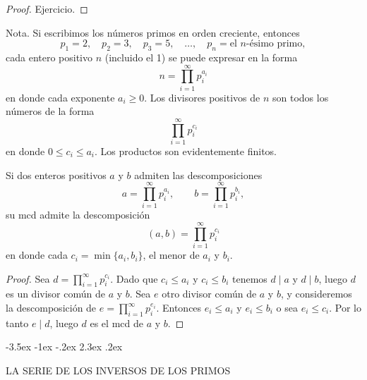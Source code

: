 \documentclass[12pt,a4paper]{book}
\makeatletter
\renewcommand\section{\@startsection{section}{1}{\z@}%
  {-3.5ex \@plus -1ex \@minus -.2ex}%
  {2.3ex \@plus .2ex}%
  {\normalfont\Large\bfseries\raggedright}}
\makeatother
\begin{document}
    \begin{proof}
        Ejercicio.
    \end{proof}

    Nota. Si escribimos los números primos en orden creciente, entonces
    \begin{equation*}
        p_{1}=2,\quad p_{2}=3,\quad p_{3}=5,\quad\dots,\quad p_{n}=\text{el $n$-ésimo primo},
    \end{equation*}
    cada entero positivo $n$ (incluido el 1) se puede expresar en la forma
    \begin{equation*}
        n=\prod_{i=1}^{\infty}p_{i}^{a_{i}}
    \end{equation*}
    en donde cada exponente $a_{i}\geq0$. Los divisores positivos de $n$ son todos los números
    de la forma
    \begin{equation*}
        \prod_{i=1}^{\infty}p_{i}^{c_{i}}
    \end{equation*}
    en donde $0\leq c_{i}\leq a_{i}$. Los productos son evidentemente finitos.

    \begin{teorema}
        Si dos enteros positivos $a$ y $b$ admiten las descomposiciones
        \begin{equation*}
            a=\prod_{i=1}^{\infty}p_{i}^{a_{i}},\qquad b=\prod_{i=1}^{\infty}p_{i}^{b_{i}},
        \end{equation*}
        su mcd admite la descomposición
        \begin{equation*}
            (a,b)=\prod_{i=1}^{\infty}p_{i}^{c_{i}}
        \end{equation*}
        en donde cada $c_{i}=\min\{a_{i},b_{i}\}$, el menor de $a_{i}$ y $b_{i}$.
    \end{teorema}

    \begin{proof}
        Sea $d=\prod_{i=1}^{\infty}p_{i}^{c_{i}}$. Dado que $c_{i}\leq a_{i}$ y $c_{i}\leq b_{i}$ tenemos
        $d\mid a$ y $d\mid b$, luego $d$ es un divisor común de $a$ y $b$. Sea $e$ otro
        divisor común de $a$ y $b$, y consideremos la descomposición de
        $e=\prod_{i=1}^{\infty}p_{i}^{e_{i}}$. Entonces $e_{i}\leq a_{i}$ y $e_{i}\leq b_{i}$ o sea
        $e_{i}\leq c_{i}$. Por lo tanto $e\mid d$, luego $d$ es el mcd de $a$ y $b$.
    \end{proof}

    \section{LA SERIE DE LOS INVERSOS DE LOS PRIMOS}
\end{document}
